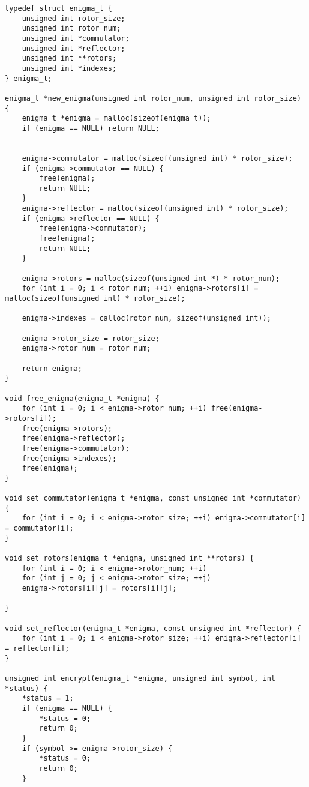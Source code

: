 \begin{center}
    \captionsetup{justification=raggedright,singlelinecheck=off}
    \begin{lstlisting}[label=lst:enigma1,caption=Реализация алгоритма шифрования машины <<Энигма>>]
typedef struct enigma_t {
	unsigned int rotor_size;
	unsigned int rotor_num;
	unsigned int *commutator;
	unsigned int *reflector;
	unsigned int **rotors;
	unsigned int *indexes;
} enigma_t;

enigma_t *new_enigma(unsigned int rotor_num, unsigned int rotor_size) {
	enigma_t *enigma = malloc(sizeof(enigma_t));
	if (enigma == NULL) return NULL;
	
	
	enigma->commutator = malloc(sizeof(unsigned int) * rotor_size);
	if (enigma->commutator == NULL) {
		free(enigma);
		return NULL;
	}
	enigma->reflector = malloc(sizeof(unsigned int) * rotor_size);
	if (enigma->reflector == NULL) {
		free(enigma->commutator);
		free(enigma);
		return NULL;
	}
	
	enigma->rotors = malloc(sizeof(unsigned int *) * rotor_num);
	for (int i = 0; i < rotor_num; ++i) enigma->rotors[i] = malloc(sizeof(unsigned int) * rotor_size);
	
	enigma->indexes = calloc(rotor_num, sizeof(unsigned int));
	
	enigma->rotor_size = rotor_size;
	enigma->rotor_num = rotor_num;
	
	return enigma;
}

void free_enigma(enigma_t *enigma) {
	for (int i = 0; i < enigma->rotor_num; ++i) free(enigma->rotors[i]);
	free(enigma->rotors);
	free(enigma->reflector);
	free(enigma->commutator);
	free(enigma->indexes);
	free(enigma);
}

void set_commutator(enigma_t *enigma, const unsigned int *commutator) {
	for (int i = 0; i < enigma->rotor_size; ++i) enigma->commutator[i] = commutator[i];
}

void set_rotors(enigma_t *enigma, unsigned int **rotors) {
	for (int i = 0; i < enigma->rotor_num; ++i)
	for (int j = 0; j < enigma->rotor_size; ++j)
	enigma->rotors[i][j] = rotors[i][j];
	
}

void set_reflector(enigma_t *enigma, const unsigned int *reflector) {
	for (int i = 0; i < enigma->rotor_size; ++i) enigma->reflector[i] = reflector[i];
}

unsigned int encrypt(enigma_t *enigma, unsigned int symbol, int *status) {
	*status = 1;
	if (enigma == NULL) {
		*status = 0;
		return 0;
	}
	if (symbol >= enigma->rotor_size) {
		*status = 0;
		return 0;
	}
	

\end{lstlisting}
\end{center}
